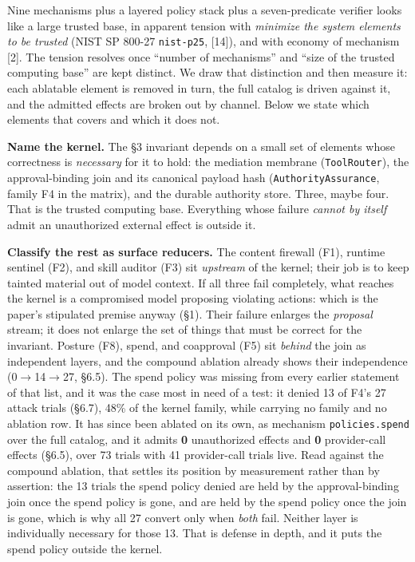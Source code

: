 \documentclass[11pt]{article}
\begin{document}
Nine mechanisms plus a layered policy stack plus a seven-predicate verifier looks like a
large trusted base, in apparent tension with \emph{minimize the system elements to be trusted} (NIST SP 800-27 \texttt{nist-p25}, {[}14{]}), and with economy of mechanism {[}2{]}. The tension resolves once ``number of mechanisms'' and
``size of the trusted computing base'' are kept distinct. We draw that distinction and then
measure it: each ablatable element is removed in turn, the full catalog is driven against it, and
the admitted effects are broken out by channel. Below we state which elements that covers and which
it does not.

\textbf{Name the kernel.} The \S3 invariant depends on a small set of elements whose correctness is
\emph{necessary} for it to hold: the mediation membrane (\texttt{ToolRouter}), the approval-binding join
and its canonical payload hash (\texttt{AuthorityAssurance}, family F4 in the matrix), and the
durable authority store. Three, maybe four. That is the trusted computing base. Everything
whose failure \emph{cannot by itself} admit an unauthorized external effect is outside it.

\textbf{Classify the rest as surface reducers.} The content firewall (F1), runtime sentinel (F2),
and skill auditor (F3) sit \emph{upstream} of the kernel; their job is to keep tainted material out
of model context. If all three fail completely, what reaches the kernel is a compromised model
proposing violating actions: which is the paper's stipulated premise anyway (\S1). Their
failure enlarges the \emph{proposal} stream; it does not enlarge the set of things that must be
correct for the invariant. Posture (F8), spend, and coapproval (F5) sit \emph{behind} the join as
independent layers, and the compound ablation already shows their independence (0$\rightarrow$14$\rightarrow$27, \S6.5).
The spend policy was missing from every earlier statement of that list, and it was the case most in
need of a test: it denied 13 of F4's 27 attack trials (\S6.7), 48\% of the kernel family, while
carrying no family and no ablation row. It has since been ablated on its own, as mechanism
\texttt{policies.spend} over the full catalog, and it admits \textbf{0} unauthorized effects and
\textbf{0} provider-call effects (\S6.5), over 73 trials with 41 provider-call trials live. Read
against the compound ablation, that settles its
position by measurement rather than by assertion: the 13 trials the spend policy denied are held by
the approval-binding join once the spend policy is gone, and are held by the spend policy once the
join is gone, which is why all 27 convert only when \emph{both} fail. Neither layer is individually
necessary for those 13. That is defense in depth, and it puts the spend policy outside the kernel.
\end{document}
